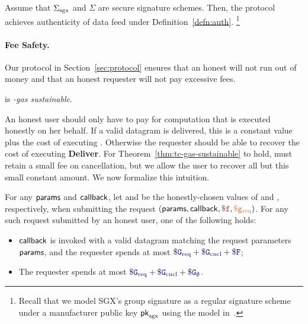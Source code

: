 \begin{theorem}[Authenticity]
\label{thm:authenticity}
Assume that ${\Sigma_{\textrm{sgx}}}$ and $\Sigma$ are secure signature schemes.
Then, the \tc protocol achieves authenticity of data feed under Definition~\ref{defn:auth}.%
\footnote{Recall that we model SGX's group signature as a regular signature scheme under a manufacturer public key ${\sf pk}_{\mathrm{sgx}}$ using the model in~\cite{sgxsok}.}
\end{theorem}




\vspace{-1ex}
\paragraph{Fee Safety.}
Our protocol in Section~\ref{sec:protocol} ensures that an honest \tcs will not run out of money
and that an honest requester will not pay excessive fees.

\begin{theorem}
\label{thm:tc-gas-sustainable}
\tcs is \emph{\constgasmax-gas sustainable}.
\end{theorem}

An honest user should only have to pay for computation that is executed honestly on her behalf.
If a valid datagram is delivered, this is a constant value plus the cost of executing \dgcallback.
Otherwise the requester should be able to recover the cost of executing {\bf Deliver}.
For Theorem~\ref{thm:tc-gas-sustainable} to hold, \tcont must retain a small fee on cancellation,
but we allow the user to recover all but this small constant amount.
We now formalize this intuition.

\begin{theorem}
\label{thm:fair-expenditure}
For any ${\sf params}$ and ${\sf callback}$,
let \constgasrequest and \consthonestfee be the honestly-chosen values of \gasrequest and \fee, respectively,
when submitting the request $(\dgform, \dgcallback, \fee, \gasrequest)$.
For any such request submitted by an honest user, one of the following holds:
\begin{itemize}
  \setlength{\itemsep}{2pt}
  \setlength{\parskip}{0pt}
  \setlength{\parsep}{0pt}
  \item ${\sf callback}$ is invoked with a valid datagram matching the request parameters ${\sf params}$,
    and the requester spends at most $\constgasrequest + \constgasinvokecancel + \consthonestfee$;

  \item The requester spends at most $\constgasrequest + \constgasinvokecancel + \constgascancel$.
\end{itemize}
\end{theorem}





